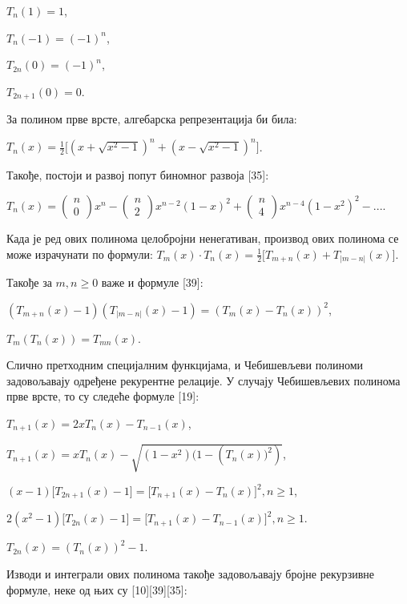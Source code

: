 \(T_{n}(1) = 1\),

\(T_{n}( - 1) = {( - 1)}^{n}\),

\(T_{2n}(0) = {( - 1)}^{n}\),

\(T_{2n + 1}(0) = 0\).

За полином прве врсте, алгебарска репрезентација би била:

\(T_{n}(x) = \frac{1}{2}\lbrack{(x + \sqrt{x^{2} - 1})}^{n} + {(x - \sqrt{x^{2} - 1})}^{n}\rbrack\).

Такође, постоји и развој попут биномног развоја {[}35{]}:

\(T_{n}(x) = \left( \begin{array}{r}
n \\
0
\end{array} \right)x^{n} - \left( \begin{array}{r}
n \\
2
\end{array} \right)x^{n - 2}{(1 - x)}^{2} + \left( \begin{array}{r}
n \\
4
\end{array} \right)x^{n - 4}{(1 - x^{2})}^{2} - ...\).

Када је ред ових полинома целобројни ненегативан, производ ових полинома
се може израчунати по формули:
\(T_{m}(x) \cdot T_{n}(x) = \frac{1}{2}\lbrack T_{m + n}(x) + T_{|m - n|}(x)\rbrack\).

Такође за \(m,n \geq 0\) важе и формуле {[}39{]}:

\((T_{m + n}(x) - 1)(T_{|m - n|}(x) - 1) = (T_{m}(x) - T_{n}(x))^{2}\),

\(T_{m}(T_{n}(x)) = T_{mn}(x)\).

Слично претходним специјалним функцијама, и Чебишевљеви полиноми
задовољавају одређене рекурентне релације. У случају Чебишевљевих
полинома прве врсте, то су следеће формуле {[}19{]}:

\(T_{n + 1}(x) = 2xT_{n}(x) - T_{n - 1}(x)\),

\(T_{n + 1}(x) = xT_{n}(x) - \sqrt{(1 - x^{2})(1 - (T_{n}{(x))}^{2})}\),

\((x - 1)\lbrack T_{2n + 1}(x) - 1\rbrack = {\lbrack T_{n + 1}(x) - T_{n}(x)\rbrack}^{2},n \geqslant 1\),

\(2(x^{2} - 1)\lbrack T_{2n}(x) - 1\rbrack = {\lbrack T_{n + 1}(x) - T_{n - 1}(x)\rbrack}^{2},n \geqslant 1\).

\(T_{2n}(x) = \left( T_{n}(x) \right)^{2} - 1\).

Изводи и интеграли ових полинома такође задовољавају бројне рекурзивне
формуле, неке од њих су {[}10{]}{[}39{]}{[}35{]}:

